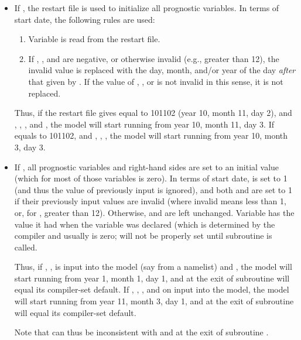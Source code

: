 \begin{itemize}
\item If , 
	the restart file is used to initialize all prognostic
	variables.  In terms of start date, the following rules are
	used:
	\begin{enumerate}
	\item Variable  is read from the restart file.
	\item If , , and 
		are negative, or otherwise
		invalid (e.g.,  greater than 12), the invalid
		value is replaced with the
		day, month, and/or year of the day \emph{after} 
		that given by .
		If the value of , , or 
		is not invalid in this sense, it is not replaced.
	\end{enumerate}
	Thus, if the restart file gives 
	 equal to 101102
	(year 10, month 11, day 2), and 
	, 
	, 
	,
	and 
	, 
	the model will start running from year 10, month 11, day 3.
	If  equals to 101102, and 
	, 
	, 
	,
	the model will start running from year 10, month 3, day 3.

\item If , 
	all prognostic variables and right-hand sides are set to an
	initial value (which for most of those variables is zero).
	In terms of start date,  is set to 1 (and thus 
	the value of  previously input is ignored), and
	both  and 
	are set to 1 
	if their previously input values are invalid (where
	invalid means less than
	1, or, for , greater than 12).
	Otherwise,  and  are left unchanged.
	Variable  has the value it had when the variable
	was declared (which is determined by the compiler and usually
	is zero;  will not be properly set until
	subroutine  is called.

	Thus, if 
	,
	, 
	 is input into the model
	(say from a namelist) and 
	,
	the model will start running from year 1, month 1, day 1,
	and  at the exit of subroutine 
	 will equal its compiler-set default.
	If 
	, 
	, 
	, and 
	 on input into the
	model,
	the model will start running from year 11, month 3, day 1,
	and  at the exit of subroutine 
	 will equal its compiler-set default.

	Note that 
	can thus be inconsistent with 
	 and  at the
	exit of subroutine .
\end{itemize}

